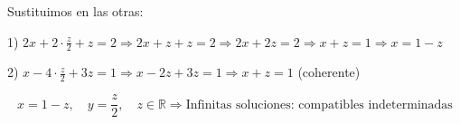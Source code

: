 \documentclass[addpoints,spanish, 12pt,a4paper]{exam}
\renewcommand*\half{.5}
\begin{document}
\begin{questions}
\begin{parts}
\begin{solution}
Sustituimos en las otras:

1) \( 2x + 2\cdot \frac{z}{2} + z = 2 \Rightarrow 2x + z + z = 2 \Rightarrow 2x + 2z = 2 \Rightarrow x + z = 1 \Rightarrow x = 1 - z \)

2) \( x - 4 \cdot \frac{z}{2} + 3z = 1 \Rightarrow x - 2z + 3z = 1 \Rightarrow x + z = 1 \) (coherente)

\[
\boxed{
x = 1 - z,\quad y = \frac{z}{2},\quad z \in \mathbb{R}
}
\Rightarrow \text{Infinitas soluciones: compatibles indeterminadas}
\]
\end{solution}
\end{parts}











\end{questions}
\end{document}
